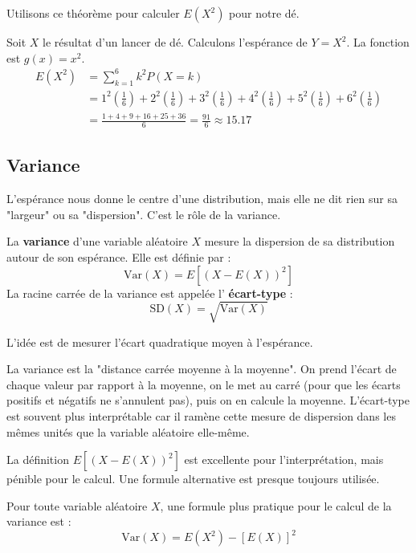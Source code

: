 Utilisons ce théorème pour calculer $E(X^2)$ pour notre dé.

\begin{examplebox}
Soit $X$ le résultat d'un lancer de dé. Calculons l'espérance de $Y=X^2$. La fonction est $g(x)=x^2$.
\begin{align*}
E(X^2) &= \sum_{k=1}^6 k^2 P(X=k) \\
&= 1^2\left(\frac{1}{6}\right) + 2^2\left(\frac{1}{6}\right) + 3^2\left(\frac{1}{6}\right) + 4^2\left(\frac{1}{6}\right) + 5^2\left(\frac{1}{6}\right) + 6^2\left(\frac{1}{6}\right) \\
&= \frac{1+4+9+16+25+36}{6} = \frac{91}{6} \approx 15.17
\end{align*}
\end{examplebox}

\subsection{Variance}

L'espérance nous donne le centre d'une distribution, mais elle ne dit rien sur sa "largeur" ou sa "dispersion". C'est le rôle de la variance.

\begin{definitionbox}
La \textbf{variance} d'une variable aléatoire $X$ mesure la dispersion de sa distribution autour de son espérance. Elle est définie par :
$$ \text{Var}(X) = E\left[ (X - E(X))^2 \right] $$
La racine carrée de la variance est appelée l' \textbf{écart-type} :
$$ \text{SD}(X) = \sqrt{\text{Var}(X)} $$
\end{definitionbox}

L'idée est de mesurer l'écart quadratique moyen à l'espérance.

\begin{intuitionbox}
La variance est la "distance carrée moyenne à la moyenne". On prend l'écart de chaque valeur par rapport à la moyenne, on le met au carré (pour que les écarts positifs et négatifs ne s'annulent pas), puis on en calcule la moyenne. L'écart-type est souvent plus interprétable car il ramène cette mesure de dispersion dans les mêmes unités que la variable aléatoire elle-même.
\end{intuitionbox}

La définition $E[(X-E(X))^2]$ est excellente pour l'interprétation, mais pénible pour le calcul. Une formule alternative est presque toujours utilisée.

\begin{theorembox}
Pour toute variable aléatoire $X$, une formule plus pratique pour le calcul de la variance est :
$$ \text{Var}(X) = E(X^2) - [E(X)]^2 $$
\end{theorembox}

